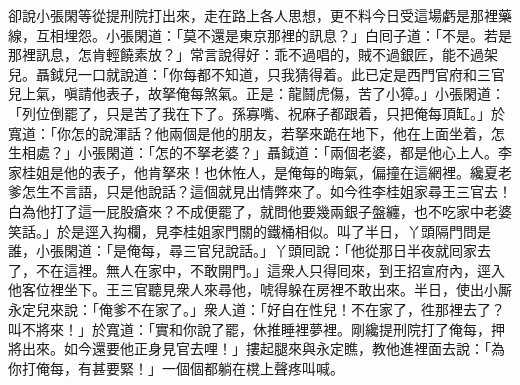 卻說小張閑等從提刑院打出來，走在路上各人思想，更不料今日受這場虧是那裡藥線，互相埋怨。小張閑道：「莫不還是東京那裡的訊息？」白囘子道：「不是。若是那裡訊息，怎肯輕饒素放？」常言說得好：乖不過唱的，賊不過銀匠，能不過架兒。{}聶鉞兒一口就說道：「你每都不知道，只我猜得着。此已定是西門官府和三官兒上氣，嗔請他表子，故拏俺每煞氣。正是：龍鬪虎傷，苦了小獐。」小張閑道：「列位倒罷了，只是苦了我在下了。孫寡嘴、祝麻子都跟着，只把俺每頂缸。」於寬道：「你怎的說渾話？他兩個是他的朋友，若拏來跪在地下，他在上面坐着，怎生相處？」小張閑道：「怎的不拏老婆？」聶鉞道：「兩個老婆，都是他心上人。李家桂姐是他的表子，他肯拏來！也休恠人，是俺每的晦氣，偏撞在這網裡。纔夏老爹怎生不言語，只是他說話？這個就見出情弊來了。如今徃李桂姐家尋王三官去！白為他打了這一屁股瘡來？不成便罷了，就問他要幾兩銀子盤纏，也不吃家中老婆笑話。」於是逕入抅欄，見李桂姐家門關的鐵桶相似。叫了半日，丫頭隔門問是誰，小張閑道：「是俺每，尋三官兒說話。」丫頭囘說：「他從那日半夜就囘家去了，不在這裡。無人在家中，不敢開門。」這衆人只得囘來，到王招宣府內，逕入他客位裡坐下。王三官聽見衆人來尋他，唬得躲在房裡不敢出來。半日，使出小厮永定兒來說：「俺爹不在家了。」衆人道：「好自在性兒！不在家了，徃那裡去了？叫不將來！」於寬道：「實和你說了罷，休推睡裡夢裡。剛纔提刑院打了俺每，押將出來。如今還要他正身見官去哩！」摟起腿來與永定瞧，教他進裡面去說：「為你打俺每，有甚要緊！」一個個都躺在櫈上聲疼叫喊。

